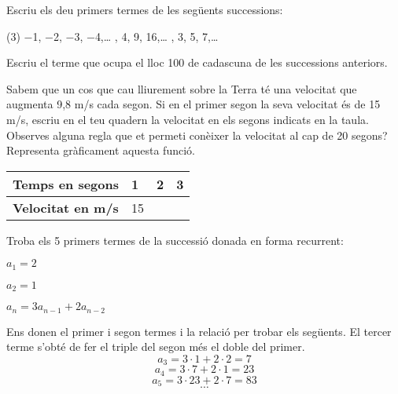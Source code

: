 \begin{mylist}

\exer  \spen Escriu els deu primers termes de les següents successions:
\begin{tasks}(3)
	\task   $-$1, $-$2, $-$3, $-$4,{\dots}   
	, 4, 9, 16,{\dots}   
	, 3, 5, 7,{\dots}
\end{tasks}
\vso
{}

\exer \spen  Escriu el terme que ocupa el lloc 100 de cadascuna de les successions anteriors.
\vso
\answers[cols=1]{[$a_n=-n;\,\,a_{100}=-100$, $a_n=n^2;\,\,a_{100}=100^2=10000$. $a_n=2n-1,\,\,a_{100}=199$]}

\exer  Sabem que un cos que cau lliurement sobre la Terra té una velocitat que augmenta 9,8 m/s cada segon. Si en el primer segon la seva velocitat és de 15 m/s, escriu en el teu quadern la velocitat en els segons indicats en la taula. Observes alguna regla que et permeti conèixer la velocitat al cap de 20 segons? Representa gràficament aquesta funció.
\end{mylist}
\begin{center}
\renewcommand{\arraystretch}{2}
\begin{tabular}{|p{}|p{}|p{}|p{}|}\hline 
\textbf{Temps en segons} & 1 & 2 & 3 \\ \hline 
\textbf{Velocitat en m/s} & 15 &  &  \\ \hline 
\end{tabular}
\end{center}

 
\pagebreak
 
\begin{resolt}[E]{
		Troba els 5 primers termes de la successió donada en forma recurrent:
		
		$a_1 = 2$
		
		$a_2 = 1$
		
		$a_n = 3 a_{n-1} + 2 a_{n-2}$
		
	}
	Ens donen el primer i segon termes i la relació per trobar els següents. El tercer terme s'obté de fer el triple del segon més el doble del primer.
	\[ a_3 = 3 \cdot 1 + 2 \cdot 2 = 7  \]
	\[ a_4 = 3 \cdot 7 + 2 \cdot 1 = 23  \]
	\[ a_5 = 3 \cdot 23 + 2 \cdot 7 = 83  \]
	\[ \cdots \]
\end{resolt}

